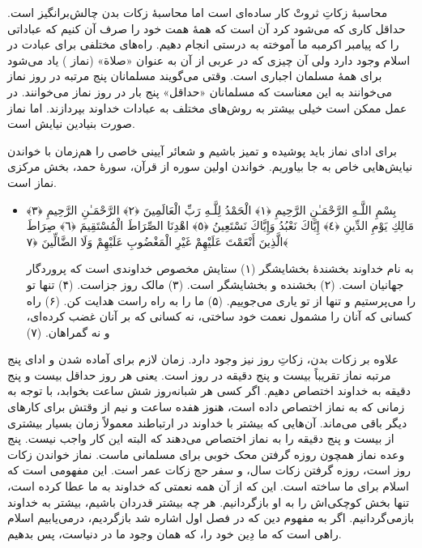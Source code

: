 محاسبهٔ زکاتِ ثروتْ کار ساده‌ای است اما محاسبهٔ زکات بدن چالش‌برانگیز است. حداقل کاری که می‌شود کرد آن است که همهٔ همت خود را صرف آن کنیم که عباداتی را که پیامبر اکرم{}به ما آموخته به درستی انجام دهیم. راه‌های مختلفی برای عبادت در اسلام وجود دارد ولی آن چیزی که در عربی از آن به عنوان «صلاة» (نماز ) یاد می‌شود برای همهٔ مسلمان اجباری است. وقتی می‌گویند مسلمانان پنج مرتبه در روز نماز می‌خوانند به این معناست که مسلمانان «حداقل» پنج بار در روز نماز می‌خوانند. در عمل ممکن است خیلی بیشتر به روش‌های مختلف به عبادات خداوند بپردازند. اما نماز صورت بنیادین نیایش است.

برای ادای نماز باید پوشیده و تمیز باشیم و شعائر آیینی خاصی را هم‌زمان با خواندن نیایش‌هایی خاص به جا بیاوریم. خواندن اولین سوره از قرآن، سورهٔ حمد، بخش مرکزی نماز است. 

\begin{itemize}
	\item[]
	{
		بِسْمِ اللَّـهِ الرَّحْمَـٰنِ الرَّحِيمِ ﴿١﴾ الْحَمْدُ لِلَّـهِ رَبِّ الْعَالَمِينَ ﴿٢﴾ الرَّحْمَـٰنِ الرَّحِيمِ ﴿٣﴾ مَالِكِ يَوْمِ الدِّينِ ﴿٤﴾ إِيَّاكَ نَعْبُدُ وَإِيَّاكَ نَسْتَعِينُ ﴿٥﴾ اهْدِنَا الصِّرَاطَ الْمُسْتَقِيمَ ﴿٦﴾ صِرَاطَ الَّذِينَ أَنْعَمْتَ عَلَيْهِمْ غَيْرِ الْمَغْضُوبِ عَلَيْهِمْ وَلَا الضَّالِّينَ ﴿٧﴾}
	
	{
		به نام خداوند بخشندهٔ بخشایشگر (۱) ستایش مخصوص خداوندی است که پروردگار جهانیان است. (۲) بخشنده و بخشایشگر است. (۳)  مالک روز جزاست. (۴) تنها تو را می‌پرستیم و تنها از تو یاری می‌جوییم. (۵) ما را به راه راست هدایت کن. (۶) راه کسانی که آنان را مشمول نعمت خود ساختی، نه کسانی که بر آنان غضب کرده‌ای، و نه گمراهان. (۷)
	}
\end{itemize}

علاوه بر زکات بدن، زکاتِ روز نیز وجود دارد. زمان لازم برای آماده شدن و ادای پنج مرتبه نماز تقریباً بیست و پنج دقیقه در روز است. یعنی هر روز حداقل بیست و پنج دقیقه به خداوند اختصاص دهیم. اگر کسی هر شبانه‌روز شش ساعت بخوابد، با توجه به زمانی که به نماز اختصاص داده است، هنوز هفده ساعت و نیم از وقتش برای کارهای دیگر باقی می‌ماند. آن‌هایی که بیشتر با خداوند در ارتباطند معمولاً زمان بسیار بیشتری از بیست و پنج دقیقه را به نماز اختصاص می‌دهند که البته این کار واجب نیست. پنج وعده نماز همچون روزه گرفتن محک خوبی برای مسلمانی ماست. نماز خواندن زکات روز است، روزه گرفتن زکات سال، و سفر حج زکات عمر است. این مفهومی است که اسلام برای ما ساخته است. این که از آن همه نعمتی که خداوند به ما عطا کرده است، تنها بخش کوچکی‌اش را به او بازگردانیم. هر چه بیشتر قدردان باشیم، بیشتر به خداوند بازمی‌گردانیم. اگر به مفهوم دین که در فصل اول اشاره شد بازگردیم، درمی‌یابیم اسلام راهی است که ما دِین خود را، که همان وجود ما در دنیاست، پس بدهیم. 

